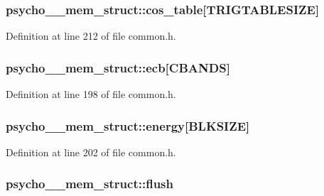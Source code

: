 \subsubsection[{\texorpdfstring{cos\+\_\+table}{cos_table}}]{ psycho\+\_\+\_\+mem\+\_\+struct\+::cos\+\_\+table\mbox{[}{\bf T\+R\+I\+G\+T\+A\+B\+L\+E\+S\+I\+ZE}\mbox{]}}\hypertarget{structpsycho__4__mem__struct_a0f9893040c375b8037449ffadb17729d}{}\label{structpsycho__4__mem__struct_a0f9893040c375b8037449ffadb17729d}


Definition at line 212 of file common.\+h.

\subsubsection[{\texorpdfstring{ecb}{ecb}}]{ psycho\+\_\+\_\+mem\+\_\+struct\+::ecb\mbox{[}{\bf C\+B\+A\+N\+DS}\mbox{]}}\hypertarget{structpsycho__4__mem__struct_ad5938470bdfcb12c21b528c2d3ff3fd4}{}\label{structpsycho__4__mem__struct_ad5938470bdfcb12c21b528c2d3ff3fd4}


Definition at line 198 of file common.\+h.

\subsubsection[{\texorpdfstring{energy}{energy}}]{ psycho\+\_\+\_\+mem\+\_\+struct\+::energy\mbox{[}{\bf B\+L\+K\+S\+I\+ZE}\mbox{]}}\hypertarget{structpsycho__4__mem__struct_a63209fc562e8a0ce96032a3097b17f51}{}\label{structpsycho__4__mem__struct_a63209fc562e8a0ce96032a3097b17f51}


Definition at line 202 of file common.\+h.

\subsubsection[{\texorpdfstring{flush}{flush}}]{ psycho\+\_\+\_\+mem\+\_\+struct\+::flush}\hypertarget{structpsycho__4__mem__struct_a04e8375be3f1369a11b55979ee86a005}{}\label{structpsycho__4__mem__struct_a04e8375be3f1369a11b55979ee86a005}


